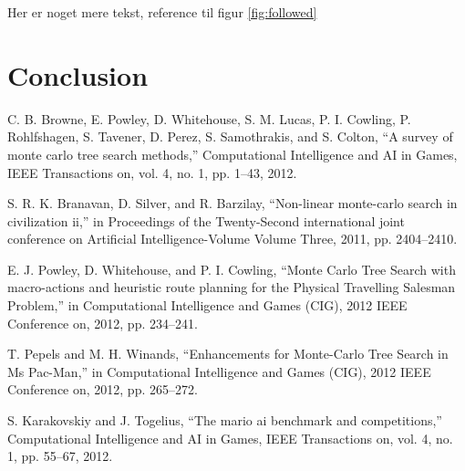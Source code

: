 \documentclass[10pt,a4paper]{article}
\begin{document}
Her er noget mere tekst, reference til figur \ref{fig:followed}

\section{Conclusion}

\clearpage
\begin{thebibliography}{99}

  C. B. Browne, E. Powley, D. Whitehouse, S. M. Lucas, P. I. Cowling, P. Rohlfshagen, S. Tavener, D. Perez, S. Samothrakis, and S. Colton, “A survey of monte carlo tree search methods,” Computational Intelligence and AI in Games, IEEE Transactions on, vol. 4, no. 1, pp. 1–43, 2012.

S. R. K. Branavan, D. Silver, and R. Barzilay, “Non-linear monte-carlo search in civilization ii,” in Proceedings of the Twenty-Second international joint conference on Artificial Intelligence-Volume Volume Three, 2011, pp. 2404–2410.

E. J. Powley, D. Whitehouse, and P. I. Cowling, “Monte Carlo Tree Search with macro-actions and heuristic route planning for the Physical Travelling Salesman Problem,” in Computational Intelligence and Games (CIG), 2012 IEEE Conference on, 2012, pp. 234–241.

T. Pepels and M. H. Winands, “Enhancements for Monte-Carlo Tree Search in Ms Pac-Man,” in Computational Intelligence and Games (CIG), 2012 IEEE Conference on, 2012, pp. 265–272.

S. Karakovskiy and J. Togelius, “The mario ai benchmark and competitions,” Computational Intelligence and AI in Games, IEEE Transactions on, vol. 4, no. 1, pp. 55–67, 2012.

\end{thebibliography}
\end{document}
